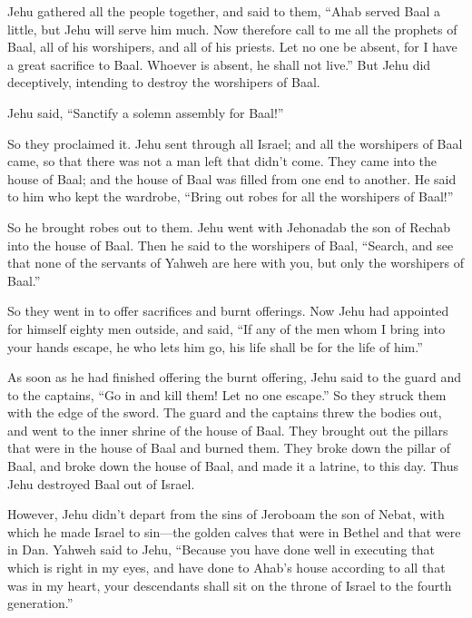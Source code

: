  Jehu gathered all the people together, and said to them,
``Ahab served Baal a little, but Jehu will serve him much. 
Now therefore call to me all the prophets of Baal, all of his
worshipers, and all of his priests. Let no one be absent, for I have a
great sacrifice to Baal. Whoever is absent, he shall not live.'' But
Jehu did deceptively, intending to destroy the worshipers of Baal.

 Jehu said, ``Sanctify a solemn assembly for Baal!''

So they proclaimed it.  Jehu sent through all Israel; and
all the worshipers of Baal came, so that there was not a man left that
didn't come. They came into the house of Baal; and the house of Baal was
filled from one end to another.  He said to him who kept
the wardrobe, ``Bring out robes for all the worshipers of Baal!''

So he brought robes out to them.  Jehu went with Jehonadab
the son of Rechab into the house of Baal. Then he said to the worshipers
of Baal, ``Search, and see that none of the servants of Yahweh are here
with you, but only the worshipers of Baal.''

 So they went in to offer sacrifices and burnt offerings.
Now Jehu had appointed for himself eighty men outside, and said, ``If
any of the men whom I bring into your hands escape, he who lets him go,
his life shall be for the life of him.''

 As soon as he had finished offering the burnt offering,
Jehu said to the guard and to the captains, ``Go in and kill them! Let
no one escape.'' So they struck them with the edge of the sword. The
guard and the captains threw the bodies out, and went to the inner
shrine of the house of Baal.  They brought out the pillars
that were in the house of Baal and burned them.  They broke
down the pillar of Baal, and broke down the house of Baal, and made it a
latrine, to this day.  Thus Jehu destroyed Baal out of
Israel.

 However, Jehu didn't depart from the sins of Jeroboam the
son of Nebat, with which he made Israel to sin---the golden calves that
were in Bethel and that were in Dan.  Yahweh said to Jehu,
``Because you have done well in executing that which is right in my
eyes, and have done to Ahab's house according to all that was in my
heart, your descendants shall sit on the throne of Israel to the fourth
generation.''

